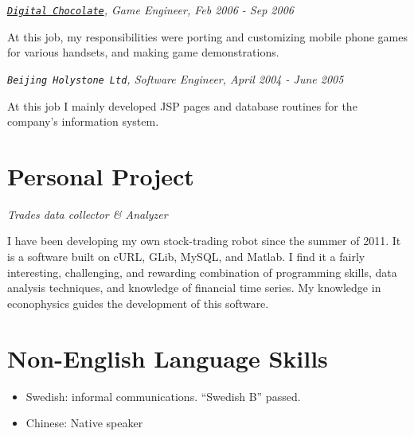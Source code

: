 \documentclass[10pt,letterpaper]{article}
\newenvironment{aperiod}{
  \begin{list}{}{
    \setlength{\leftmargin}{1.5em}
    \setlength{\itemsep}{1em}
    \setlength{\parskip}{0pt}
    \setlength{\parsep}{0.25em}
  }
}{
  \end{list}
}
\begin{document}
\begin{aperiod}
\item {\it
    \href{http://www.digitalchocolate.com/}{\tt Digital Chocolate},
    Game Engineer, Feb 2006 - Sep 2006}

  At this job, my responsibilities were porting and customizing mobile
  phone games for various handsets, and making game demonstrations.

\item {\it {\tt Beijing Holystone Ltd}, Software
    Engineer, April 2004 - June 2005}

  At this job I mainly developed JSP pages and database routines for
  the company's information system.
\end{aperiod}

\section*{Personal Project}
{\it Trades data collector \& Analyzer}

I have been developing my own stock-trading robot since the summer of
2011. It is a software built on cURL, GLib, MySQL, and Matlab. I find
it a fairly interesting, challenging, and rewarding combination of
programming skills, data analysis techniques, and knowledge of
financial time series. My knowledge in econophysics guides the
development of this software.

\section*{Non-English Language Skills}
\begin{itemize}
\item Swedish: informal communications. ``Swedish B'' passed.
\item Chinese: Native speaker
\end{itemize}
\end{document}
